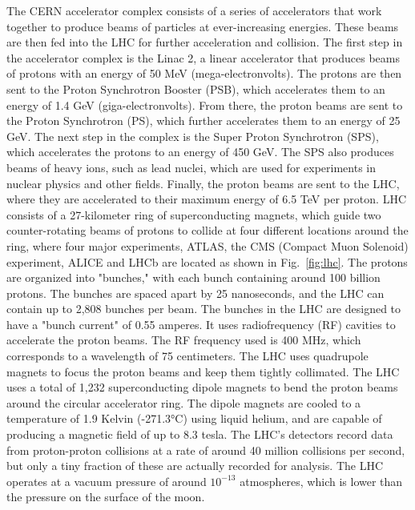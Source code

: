 The CERN accelerator complex consists of a series of accelerators that work together to produce beams of particles at ever-increasing energies. These beams are then fed into the LHC for further acceleration and collision. The first step in the accelerator complex is the Linac 2, a linear accelerator that produces beams of protons with an energy of 50 MeV (mega-electronvolts). The protons are then sent to the Proton Synchrotron Booster (PSB), which accelerates them to an energy of 1.4 GeV (giga-electronvolts). From there, the proton beams are sent to the Proton Synchrotron (PS), which further accelerates them to an energy of 25 GeV. The next step in the complex is the Super Proton Synchrotron (SPS), which accelerates the protons to an energy of 450 GeV. The SPS also produces beams of heavy ions, such as lead nuclei, which are used for experiments in nuclear physics and other fields. Finally, the proton beams are sent to the LHC, where they are accelerated to their maximum energy of 6.5 TeV per proton. LHC consists of a 27-kilometer ring of superconducting magnets, which guide two counter-rotating beams of protons to collide at four different locations around the ring, where four major experiments, ATLAS, the CMS (Compact Muon Solenoid) experiment, ALICE and LHCb are located as shown in Fig.~\ref{fig:lhc}. The protons are organized into "bunches," with each bunch containing around 100 billion protons. The bunches are spaced apart by 25 nanoseconds, and the LHC can contain up to 2,808 bunches per beam. The bunches in the LHC are designed to have a "bunch current" of 0.55 amperes. It uses radiofrequency (RF) cavities to accelerate the proton beams. The RF frequency used is 400 MHz, which corresponds to a wavelength of 75 centimeters. The LHC uses quadrupole magnets to focus the proton beams and keep them tightly collimated. The LHC uses a total of 1,232 superconducting dipole magnets to bend the proton beams around the circular accelerator ring. The dipole magnets are cooled to a temperature of 1.9 Kelvin (-271.3°C) using liquid helium, and are capable of producing a magnetic field of up to 8.3 tesla. The LHC's detectors record data from proton-proton collisions at a rate of around 40 million collisions per second, but only a tiny fraction of these are actually recorded for analysis. The LHC operates at a vacuum pressure of around $10^{-13}$ atmospheres, which is lower than the pressure on the surface of the moon.


